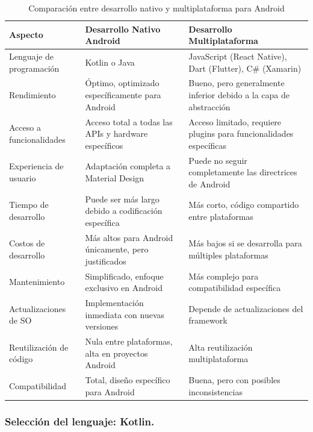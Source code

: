 \begin{table}[H]
\centering
\caption{Comparación entre desarrollo nativo y multiplataforma para Android}
\label{tab:comparacion_nativo_multiplataforma}
\begin{tabular}{|p{}|p{}|p{}|}
\hline
\textbf{Aspecto}{\cellcolor[gray]{0.9}} & \textbf{Desarrollo Nativo Android}{\cellcolor[gray]{0.9}} & \textbf{Desarrollo Multiplataforma}{\cellcolor[gray]{0.9}} \\
\hline
Lenguaje de programación & Kotlin o Java & JavaScript (React Native), Dart (Flutter), C\# (Xamarin) \\
\hline
Rendimiento & Óptimo, optimizado específicamente para Android & Bueno, pero generalmente inferior debido a la capa de abstracción \\
\hline
Acceso a funcionalidades & Acceso total a todas las APIs y hardware específicos & Acceso limitado, requiere plugins para funcionalidades específicas \\
\hline
Experiencia de usuario & Adaptación completa a Material Design & Puede no seguir completamente las directrices de Android \\
\hline
Tiempo de desarrollo & Puede ser más largo debido a codificación específica & Más corto, código compartido entre plataformas \\
\hline
Costos de desarrollo & Más altos para Android únicamente, pero justificados & Más bajos si se desarrolla para múltiples plataformas \\
\hline
Mantenimiento & Simplificado, enfoque exclusivo en Android & Más complejo para compatibilidad específica \\
\hline
Actualizaciones de SO & Implementación inmediata con nuevas versiones & Depende de actualizaciones del framework \\
\hline
Reutilización de código & Nula entre plataformas, alta en proyectos Android & Alta reutilización multiplataforma \\
\hline
Compatibilidad & Total, diseño específico para Android & Buena, pero con posibles inconsistencias \\
\hline
\end{tabular}
\end{table}

\subsubsection{Selección del lenguaje: Kotlin.}

